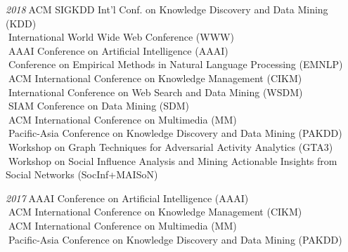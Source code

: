 \documentclass[10pt]{article}
\newenvironment{myindentpar}[1]%
{\begin{list}{}%
         {\setlength{\leftmargin}{#1}}%
         \item[]%
}
{\end{list}}
\newcounter{list}
\begin{document}
\begin{myindentpar}{0.75cm}
{\hspace{-0.75cm}\emph{2018}\textcolor{white}{.}ACM SIGKDD Int'l Conf. on Knowledge Discovery and Data Mining (KDD) \\
\textcolor{white}{.}International World Wide Web Conference (WWW) \\
\textcolor{white}{.}AAAI Conference on Artificial Intelligence (AAAI) \\
\textcolor{white}{.}Conference on Empirical Methods in Natural Language Processing (EMNLP) \\
\textcolor{white}{.}ACM International Conference on Knowledge Management (CIKM) \\
\textcolor{white}{.}International Conference on Web Search and Data Mining (WSDM) \\
\textcolor{white}{.}SIAM Conference on Data Mining (SDM) \\
\textcolor{white}{.}ACM International Conference on Multimedia (MM) \\
\textcolor{white}{.}Pacific-Asia Conference on Knowledge Discovery and Data Mining (PAKDD) \\
\textcolor{white}{.}Workshop on Graph Techniques for Adversarial Activity Analytics (GTA3) \\
\textcolor{white}{.}Workshop on Social Influence Analysis and Mining Actionable Insights from Social Networks (SocInf+MAISoN)

\hspace{-0.75cm}\emph{2017}\textcolor{white}{.}AAAI Conference on Artificial Intelligence (AAAI) \\
\textcolor{white}{.}ACM International Conference on Knowledge Management (CIKM) \\
\textcolor{white}{.}ACM International Conference on Multimedia (MM) \\
\textcolor{white}{.}Pacific-Asia Conference on Knowledge Discovery and Data Mining (PAKDD)

}

\hspace{-0.75cm}{\bf Journal Reviewer}

{\small

}
\end{myindentpar}
\end{document}
